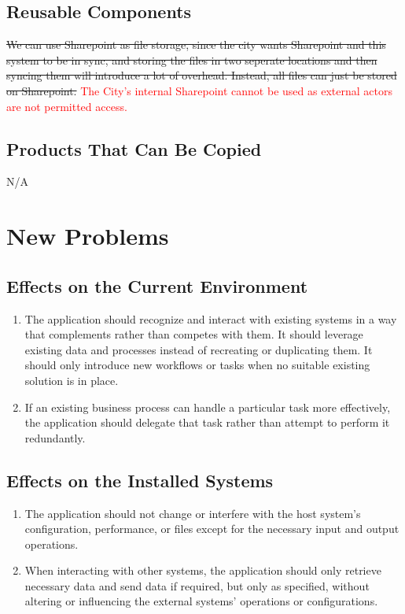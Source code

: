 \documentclass[12pt]{article}
\begin{document}
\subsection{Reusable Components}
\sout{We can use Sharepoint as file storage, since the city wants Sharepoint and this
system to be in sync, and storing the files in two seperate locations and then
syncing them will introduce a lot of overhead. Instead, all files can just be
stored on Sharepoint.} \textcolor{red}{The City's internal Sharepoint cannot be used as external actors are not permitted access.}
\subsection{Products That Can Be Copied}
N/A

\section{New Problems}
\subsection{Effects on the Current Environment}
\begin{enumerate}
  \item The application should recognize and interact with existing
    systems in a way that complements rather than competes with them.
    It should leverage existing data and processes instead of
    recreating or duplicating them.
    It should only introduce new workflows or tasks when no suitable
    existing solution is in place.
  \item If an existing business process can handle a particular task
    more effectively, the application should delegate that task
    rather than attempt to perform it redundantly.
\end{enumerate}
\subsection{Effects on the Installed Systems}
\begin{enumerate}
  \item The application should not change or interfere with the host
    system's configuration, performance, or files except for the
    necessary input and output operations.
  \item When interacting with other systems, the application should
    only retrieve necessary data and send data if required, but only
    as specified, without altering or influencing the external
    systems' operations or configurations.
\end{enumerate}
\end{document}
